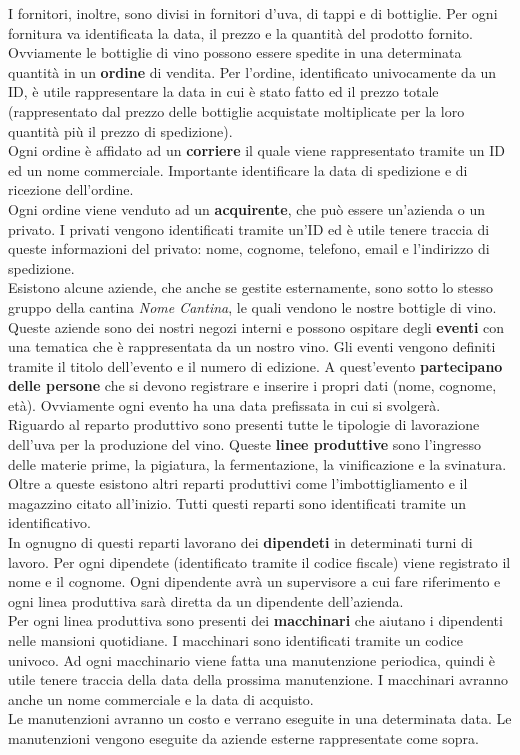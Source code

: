 I fornitori, inoltre, sono divisi in fornitori d'uva, di tappi e di bottiglie. Per ogni fornitura va identificata la data, il prezzo e la quantità del prodotto fornito.\\
Ovviamente le bottiglie di vino possono essere spedite in una determinata quantità in un \textbf{ordine} di vendita. Per l'ordine, identificato univocamente da un ID, è utile rappresentare la data in cui è stato fatto ed il prezzo totale (rappresentato dal prezzo delle bottiglie acquistate moltiplicate per la loro quantità più il prezzo di spedizione).\\
Ogni ordine è affidato ad un \textbf{corriere} il quale viene rappresentato tramite un ID ed un nome commerciale. Importante identificare la data di spedizione e di ricezione dell'ordine.\\
Ogni ordine viene venduto ad un \textbf{acquirente}, che può essere un'azienda o un privato. I privati vengono identificati tramite un'ID ed è utile tenere traccia di queste informazioni del privato: nome, cognome, telefono, email e l'indirizzo di spedizione.\\
Esistono alcune aziende, che anche se gestite esternamente, sono sotto lo stesso gruppo della cantina \emph{Nome Cantina}, le quali vendono le nostre bottigle di vino.\\
Queste aziende sono dei nostri negozi interni e possono ospitare degli \textbf{eventi} con una tematica che è rappresentata da un nostro vino. Gli eventi vengono definiti tramite il titolo dell'evento e il numero di edizione. A quest'evento \textbf{partecipano delle persone} che si devono registrare e inserire i propri dati (nome, cognome, età). Ovviamente ogni evento ha una data prefissata in cui si svolgerà.\\
Riguardo al reparto produttivo sono presenti tutte le tipologie di lavorazione dell'uva per la produzione del vino. Queste \textbf{linee produttive} sono l'ingresso delle materie prime, la pigiatura, la fermentazione, la vinificazione e la svinatura. Oltre a queste esistono altri reparti produttivi come l'imbottigliamento e il magazzino citato all'inizio. Tutti questi reparti sono identificati tramite un identificativo.\\
In ognugno di questi reparti lavorano dei \textbf{dipendeti} in determinati turni di lavoro. Per ogni dipendete (identificato tramite il codice fiscale) viene registrato il nome e il cognome. Ogni dipendente avrà un supervisore a cui fare riferimento e ogni linea produttiva sarà diretta da un dipendente dell'azienda.\\
Per ogni linea produttiva sono presenti dei \textbf{macchinari} che aiutano i dipendenti nelle mansioni quotidiane. I macchinari sono identificati tramite un codice univoco. Ad ogni macchinario viene fatta una manutenzione periodica, quindi è utile tenere traccia della data della prossima manutenzione. I macchinari avranno anche un nome commerciale e la data di acquisto.\\
Le manutenzioni avranno un costo e verrano eseguite in una determinata data. Le manutenzioni vengono eseguite da aziende esterne rappresentate come sopra.